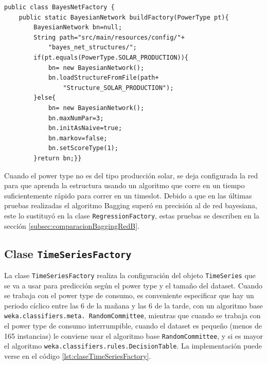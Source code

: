 
\begin{lstlisting}[frame=single]  
public class BayesNetFactory {
	public static BayesianNetwork buildFactory(PowerType pt){
		BayesianNetwork bn=null;
		String path="src/main/resources/config/"+
			"bayes_net_structures/";
		if(pt.equals(PowerType.SOLAR_PRODUCTION)){
			bn= new BayesianNetwork();
			bn.loadStructureFromFile(path+
				"Structure_SOLAR_PRODUCTION");
		}else{
			bn= new BayesianNetwork(); 
			bn.maxNumPar=3;
			bn.initAsNaive=true;
			bn.markov=false;
			bn.setScoreType(1);
		}return bn;}}
\end{lstlisting}
Cuando el power type no es del tipo producción solar, se deja configurada la red para que aprenda la estructura usando un algoritmo que corre en un tiempo suficientemente rápido para correr en un timeslot. Debido a que en las últimas pruebas realizadas el algoritmo Bagging superó en precisión al de red bayesiana, este lo sustituyó en la clase \texttt{RegressionFactory}, estas pruebas se describen en la sección \ref{subsec:comparacionBaggingRedB}.

\subsection{Clase \texttt{TimeSeriesFactory}} \label{subsec:claseTimeSeriesFactory}
La clase \texttt{TimeSeriesFactory} realiza la configuración del objeto \texttt{TimeSeries} que se va a usar para predicción según el power type y el tamaño del dataset. Cuando se trabaja con el power type de consumo, es conveniente especificar que hay un periodo cíclico entre las 6 de la mañana y las 6 de la tarde, con un algoritmo base \texttt{weka.classifiers.meta. RandomCommittee}, mientras que cuando se trabaja con el power type de consumo interrumpible, cuando el dataset es pequeño (menos de 165 instancias) le conviene usar el algoritmo base \texttt{RandomCommittee}, y si es mayor el algoritmo \texttt{weka.classifiers.rules.DecisionTable}. La implementación puede verse en el código \ref{lst:claseTimeSeriesFactory}.



